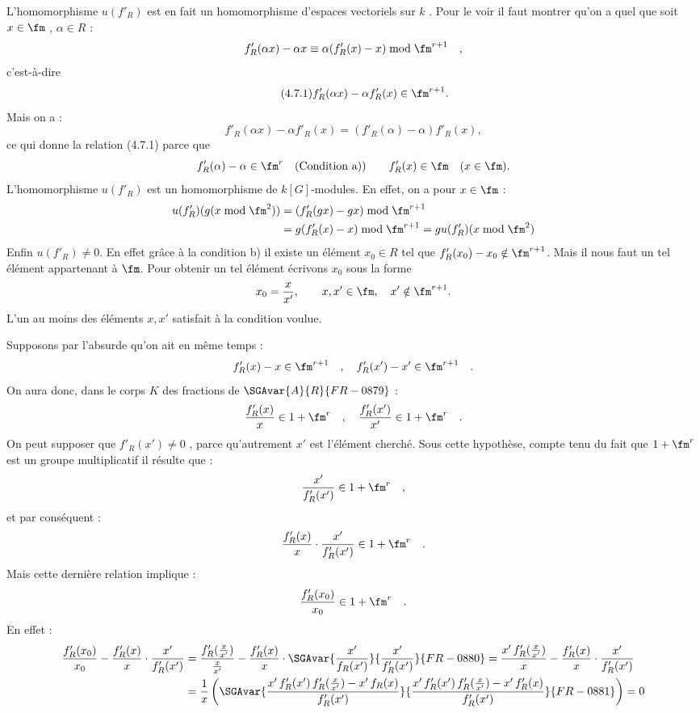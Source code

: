 L'homomorphisme $u(f'_R)$ est en fait un homomorphisme d'espaces vectoriels sur $k$ . Pour le voir il faut montrer qu'on a quel que soit $x \in \fm$ , $\alpha \in R$ :
\[
f'_R(\alpha x) - \alpha x \equiv \alpha(f'_R(x) - x) \bmod \fm^{r+1} \quad ,
\]
c'est-à-dire
\begin{equation}
\tag{4.7.1}
f'_R(\alpha x)-\alpha f'_R(x)\in\fm^{r+1}.
\end{equation}
Mais on a :
\[
f'_R(\alpha x)-\alpha f'_R(x)=(f'_R(\alpha)-\alpha)f'_R(x),
\]
ce qui donne la relation (4.7.1) parce que
\[
f'_R(\alpha)-\alpha\in\fm^r\quad\hbox{(Condition a))}
\qquad
f'_R(x)\in\fm\quad (x\in\fm).
\]
L'homomorphisme $u(f'_R)$ est un homomorphisme de $k[G]$-modules. En effet, on a pour $x\in\fm$ :
\[
\begin{aligned}
u(f'_R)(g(x\bmod\fm^2))
&=(f'_R(gx)-gx)\bmod\fm^{r+1}\\
&=g(f'_R(x)-x)\bmod\fm^{r+1}
=gu(f'_R)(x\bmod\fm^2)
\end{aligned}
\]
Enfin $u(f'_R)\ne0$. En effet grâce à la condition b) il existe un élément $x_0\in R$ tel que $f'_R(x_0)-x_0\notin\fm^{r+1}$. Mais il nous faut un tel élément appartenant à $\fm$. Pour obtenir un tel élément écrivons $x_0$ sous la forme
\[
x_0=\frac{x}{x'},\qquad x,x'\in\fm,\quad x'\notin\fm^{r+1}.
\]
L'un au moins des éléments $x,x'$ satisfait à la condition voulue.

Supposons par l'absurde qu'on ait en même temps :
\[
f'_R(x) - x \in \fm^{r+1} \quad , \quad f'_R(x') - x' \in \fm^{r+1} \quad .
\]
On aura donc, dans le corps $K$ des fractions de $\SGAvar{A}{R}{FR-0879}$ :
\[
\frac{f'_R(x)}{x} \in 1 + \fm^r \quad , \quad \frac{f'_R(x')}{x'} \in 1 + \fm^r \quad .
\]
On peut supposer que $f'_R(x') \neq 0$ , parce qu'autrement $x'$ est l'élément cherché. Sous cette hypothèse, compte tenu du fait que $1 + \fm^r$ est un groupe multiplicatif il résulte que :
\[
\frac{x'}{f'_R(x')} \in 1 + \fm^r \quad ,
\]
et par conséquent :
\[
\frac{f'_R(x)}{x} \cdot \frac{x'}{f'_R(x')} \in 1 + \fm^r \quad .
\]
Mais cette dernière relation implique :
\[
\frac{f'_R(x_0)}{x_0} \in 1 + \fm^r \quad .
\]
En effet :
\[
\begin{aligned}
\frac{f'_R(x_0)}{x_0} - \frac{f'_R(x)}{x} \cdot \frac{x'}{f'_R(x')}
&= \frac{f'_R(\frac{x}{x'})}{\frac{x}{x'}} - \frac{f'_R(x)}{x} \cdot \SGAvar{\frac{x'}{f_R(x')}}{\frac{x'}{f'_R(x')}}{FR-0880}
= \frac{x'\,f'_R(\frac{x}{x'})}{x} - \frac{f'_R(x)}{x} \cdot \frac{x'}{f'_R(x')} \\
&= \frac{1}{x}\left(\SGAvar{\frac{x'\,f'_R(x')\,f'_R(\frac{x}{x'}) - x'\,f_R(x)}{f'_R(x')}}{\frac{x'\,f'_R(x')\,f'_R(\frac{x}{x'}) - x'\,f'_R(x)}{f'_R(x')}}{FR-0881}\right) = 0
\end{aligned}
\]

